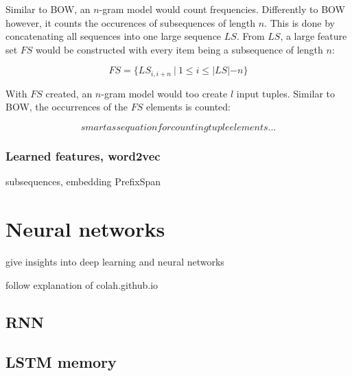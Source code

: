 Similar to BOW, an $n$-gram model would count frequencies. Differently to BOW however, it counts the occurences of subsequences of length $n$. This is done by concatenating all sequences into one large sequence $LS$. From $LS$, a large feature set $FS$ would be constructed with every item being a subsequence of length $n$:

\begin{equation}
    FS = \{LS_{i,i+n}\ |\ 1 \leq i \leq |LS|-n \}
\end{equation}

With $FS$ created, an $n$-gram model would too create $l$ input tuples. Similar to BOW, the occurrences of the $FS$ elements is counted:

\begin{equation}
    smart ass equation for counting tuple elements...
\end{equation}

\subsubsection{Learned features, word2vec}
subsequences, embedding
PrefixSpan

\section{Neural networks}
give insights into deep learning and neural networks 

follow explanation of colah.github.io

\subsection{RNN}
\subsection{LSTM memory}